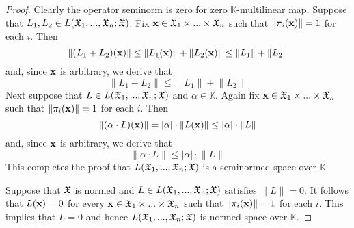    \begin{proof}
   Clearly the operator seminorm is zero for zero $\mathbb{K}$-multilinear map. Suppose that $L_1,L_2 \in L({\mathfrak X}_1,...,{\mathfrak X}_n;{\mathfrak X})$. Fix $\mathbf{x} \in {\mathfrak X}_1\times ...\times {\mathfrak X}_n$ such that $\lVert \pi_i(\mathbf{x}) \rVert = 1$ for each $i$. Then
   $$\lVert (L_1 + L_2)(\mathbf{x})\rVert \leq  \lVert L_1(\mathbf{x})\rVert + \lVert L_2(\mathbf{x}) \rVert \leq \lVert L_1 \rVert + \lVert L_2 \rVert$$
   and, since $\mathbf{x}$ is arbitrary, we derive that
   $$\lVert L_1 + L_2 \rVert \leq \lVert L_1 \rVert + \lVert L_2 \rVert$$
   Next suppose that $L \in L({\mathfrak X}_1,...,{\mathfrak X}_n;{\mathfrak X})$ and $\alpha \in \mathbb{K}$. Again fix $\mathbf{x} \in {\mathfrak X}_1\times ...\times {\mathfrak X}_n$ such that $\lVert \pi_i(\mathbf{x}) \rVert = 1$ for each $i$. Then
   $$\lVert (\alpha\cdot L)(\mathbf{x})\rVert = |\alpha|\cdot \lVert L(\mathbf{x})\rVert \leq |\alpha|\cdot \lVert L \rVert$$  
   and, since $\mathbf{x}$ is arbitrary, we derive that
   $$\lVert \alpha \cdot L\rVert \leq |\alpha|\cdot \lVert L \rVert$$
   This completes the proof that $L({\mathfrak X}_1,...,{\mathfrak X}_n;{\mathfrak X})$ is a seminormed space over $\mathbb{K}$.

   Suppose that ${\mathfrak X}$ is normed and $L \in L({\mathfrak X}_1,...,{\mathfrak X}_n;{\mathfrak X})$ satisfies $\lVert L \rVert = 0$. It follows that $L(\mathbf{x}) = 0$ for every $\mathbf{x} \in {\mathfrak X}_1\times ...\times {\mathfrak X}_n$ such that $\lVert \pi_i(\mathbf{x}) \rVert = 1$ for each $i$. This implies that $L = 0$ and hence $L({\mathfrak X}_1,...,{\mathfrak X}_n;{\mathfrak X})$ is normed space over $\mathbb{K}$.
   

\end{proof}
